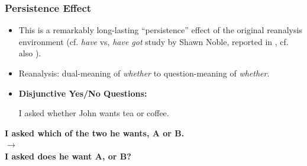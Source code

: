 \documentclass[hyperref={pdfpagelabels=false}]{beamer}
\begin{document}
\begin{frame}
\frametitle{Persistence Effect}
\begin{itemize}
	\item This is a remarkably long-lasting ``persistence'' effect of the original reanalysis environment (cf. \textsl{have} vs, \textsl{have got} study by Shawn Noble, reported in \citealt{kroch1989}, cf. also \citealt{labov1989}).
	\item Reanalysis: dual-meaning of \textsl{whether} to question-meaning of \textsl{whether}\citep{baileywallenbergwurff2012}.
	\item[ ]\textbf{Disjunctive Yes/No Questions:}
\begin{exe}
	\ex I asked whether John wants tea or coffee.
\end{exe}
\end{itemize}
\begin{center}
 \textbf{I asked which of the two he wants, A or B.} \\$\longrightarrow$ 
 \\ \textbf{I asked does he want A, or B?}
\end{center}

\end{frame}



\end{document}
